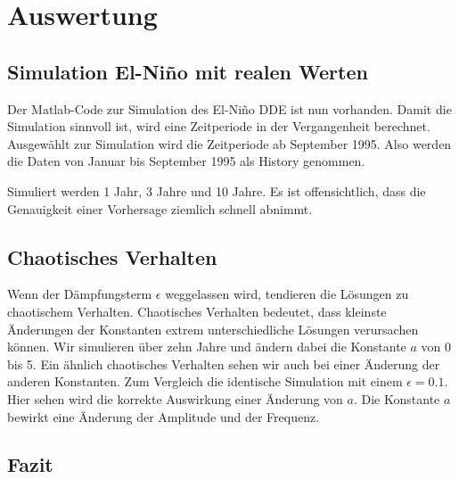 \section{Auswertung}
\subsection{Simulation El-Niño mit realen Werten}
Der Matlab-Code zur Simulation des El-Niño DDE ist nun vorhanden.
Damit die Simulation sinnvoll ist, wird eine Zeitperiode in der Vergangenheit berechnet.
Ausgewählt zur Simulation wird die Zeitperiode ab September 1995. 
Also werden die Daten von Januar bis September 1995 als History genommen.

Simuliert werden 1 Jahr, 3 Jahre und 10 Jahre.
Es ist offensichtlich, dass die Genauigkeit einer Vorhersage ziemlich schnell abnimmt.

\subsection{Chaotisches Verhalten}
Wenn der Dämpfungsterm $\epsilon$ weggelassen wird, tendieren die Lösungen zu chaotischem Verhalten.
Chaotisches Verhalten bedeutet, dass kleinste Änderungen der Konstanten extrem unterschiedliche Lösungen verursachen können. 
Wir simulieren über zehn Jahre und ändern dabei die Konstante $a$ von 0 bis 5.
Ein ähnlich chaotisches Verhalten sehen wir auch bei einer Änderung der anderen Konstanten.
Zum Vergleich die identische Simulation mit einem $\epsilon = 0.1$. 
Hier sehen wird die korrekte Auswirkung einer Änderung von $a$.
Die Konstante $a$ bewirkt eine Änderung der Amplitude und der Frequenz.


\subsection{Fazit}
